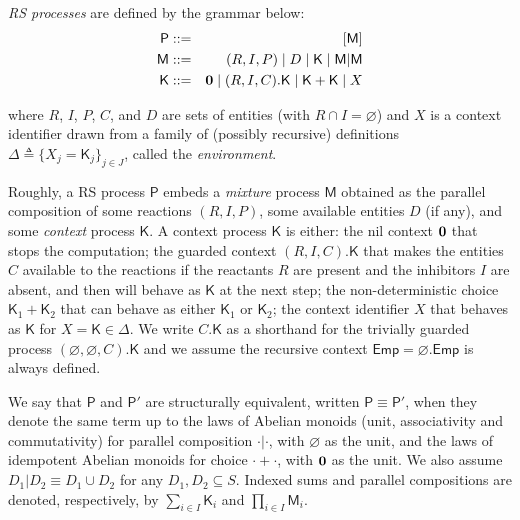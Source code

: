 \emph{RS processes} are defined by the grammar below:
\begin{eqnarray*}
\mathsf{P} & ::= & [\mathsf{M}]
\\
\mathsf{M} & ::= & (R,I,P) \mid D \mid \mathsf{K} \mid \mathsf{M}|\mathsf{M}
\\
\mathsf{K} & ::= & \mathbf{0} \mid (R,I,C).\mathsf{K} \mid \mathsf{K}+\mathsf{K} \mid X
\end{eqnarray*}

\noindent
where $R$, $I$, $P$, $C$, and $D$ are sets of entities (with $R\cap I=\varnothing$) and $X$ is a context identifier drawn from a family of (possibly recursive) definitions $\Delta \triangleq\{X_j=\mathsf{K}_j\}_{j\in J}$, called the \emph{environment}.

Roughly, a RS process  $\mathsf{P}$ embeds a \emph{mixture} process $\mathsf{M}$ obtained as the parallel composition of some reactions $(R,I,P)$, some available entities $D$ (if any), and some \emph{context} process $\mathsf{K}$.
A  context process $\mathsf{K}$ is either: 
the nil context $\mathbf{0}$ that stops the computation;
the guarded context $(R,I,C).\mathsf{K}$ that makes the entities $C$ available to the reactions if the reactants $R$ are present and the inhibitors $I$ are absent, and then will behave as $\mathsf{K}$ at the next step;
the non-deterministic choice $\mathsf{K}_1+\mathsf{K}_2$ that can behave as either  $\mathsf{K}_1$ or $\mathsf{K}_2$;  
the context identifier $X$ that behaves as $\mathsf{K}$ for $X=\mathsf{K}\in \Delta$.
We write $C.\mathsf{K}$ as a shorthand for the trivially guarded process $(\varnothing,\varnothing,C).\mathsf{K}$ and we assume the recursive context $\mathsf{Emp}=\varnothing.\mathsf{Emp}$ is always defined.


We say that $\mathsf{P}$ and $\mathsf{P}'$ are structurally equivalent, written $\mathsf{P} \equiv \mathsf{P}'$, when they denote the same term up to the laws of Abelian monoids (unit, associativity and commutativity) for  parallel composition $\cdot | \cdot$, with $\varnothing$ as the unit, and the laws of idempotent Abelian monoids for choice $\cdot +\cdot$, with $\mathbf{0}$ as the unit. We also assume $D_1 | D_2 \equiv D_1\cup D_2$ for any $D_1,D_2\subseteq S$.
Indexed sums and parallel compositions are denoted, respectively, by $\sum_{i\in I} \mathsf{K}_i$ and $\prod_{i\in I} \mathsf{M}_i$.


